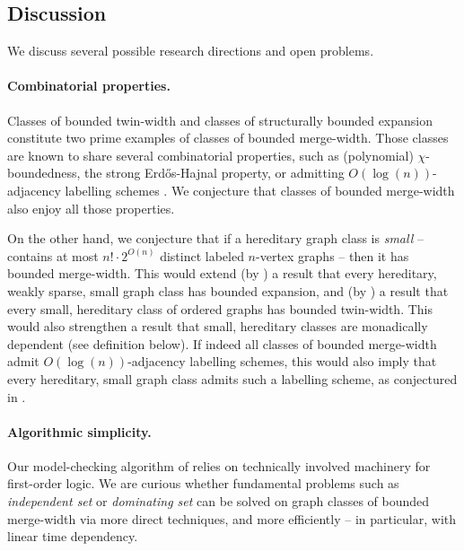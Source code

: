 \documentclass[11pt]{article}
\newcommand{\sz}[1]{\todo[color=pink!40]{sz: #1}}
\theoremstyle{remark}
\begin{document}
\subsection*{Discussion}
We discuss several possible research directions and open problems.

\paragraph{Combinatorial properties.}
Classes of bounded twin-width and classes of structurally bounded expansion  constitute two prime examples
of classes of bounded merge-width.
Those classes are known to share several combinatorial properties, such as
(polynomial) $\chi$-boundedness, the strong Erd{\H o}s-Hajnal property, or admitting $O(\log(n))$-adjacency labelling sche\-mes \cite{tww2, tww3, lsd-journal}.
We conjecture that classes of  bounded merge-width also enjoy all those properties.

On the other hand, we conjecture that if a hereditary graph class is \emph{small} -- contains at most $n!\cdot 2^{O(n)}$ distinct labeled $n$-vertex graphs -- then it has bounded merge-width. This would extend (by ) a result
\cite{DBLP:conf/innovations/BonnetD0Z25}
 that every hereditary, weakly sparse, small graph class has bounded expansion,
and (by ) a result %
\cite{tww4} that every small, hereditary class of ordered graphs has bounded twin-width.
This would also strengthen a result
\cite{braunfeld2023existentialcharacterizationsmonadicnip,flip-breakability} that small, hereditary classes are monadically dependent (see definition below).
If indeed all classes of bounded merge-width admit $O(\log(n))$-adjacency labelling schemes, this would also imply that every hereditary, small graph class admits such a labelling scheme, as conjectured in \cite{bonnet_et_al:LIPIcs.ICALP.2024.31}.



\paragraph{Algorithmic simplicity.}
 Our model-checking algorithm of  relies on technically involved machinery for first-order logic.
 We are curious whether fundamental problems such as \emph{independent set} or \emph{dominating set}
 can be solved on graph classes of bounded merge-width via more direct techniques, and more efficiently --
 in particular, with linear time dependency.
\end{document}
